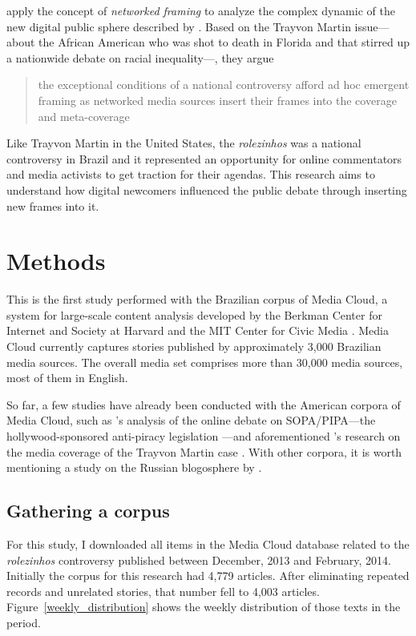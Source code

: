 \citeauthor{graeff2014battle} apply the concept of \emph{networked framing} to analyze the complex dynamic of the new digital public sphere described by \citeauthor{benkler2006wealth}. Based on the Trayvon Martin issue---about the African American who was shot to death in Florida and that stirred up a nationwide debate on racial inequality---, they argue \blockcquote{graeff2014battle}[.]{the exceptional conditions of a national controversy \textelp{} afford ad hoc emergent framing as networked media sources insert their frames into the coverage and meta-coverage}

Like Trayvon Martin in the United States, the \emph{rolezinhos} was a national controversy in Brazil and it represented an opportunity for online commentators and media activists to get traction for their agendas. This research aims to understand how digital newcomers influenced the public debate through inserting new frames into it.

\section{Methods}
\label{sec:methods}

This is the first study performed with the Brazilian corpus of Media Cloud, a system for large-scale content analysis developed by the Berkman Center for Internet and Society at Harvard and the MIT Center for Civic Media \autocite{about_media_cloud}. Media Cloud currently captures stories published by approximately 3,000 Brazilian media sources. The overall media set comprises more than 30,000 media sources, most of them in English.

So far, a few studies have already been conducted with the American corpora of Media Cloud, such as \citeauthor{benkler2013social}'s analysis of the online debate on SOPA/PIPA---the hollywood-sponsored anti-piracy legislation \autocite{benkler2013social}---and aforementioned \citeauthor{graeff2014battle}'s research on the media coverage of the Trayvon Martin case \autocite{graeff2014battle}. With other corpora, it is worth mentioning a study on the Russian blogosphere by \citeauthor{etling2014blogs} \autocite{etling2014blogs}.

\subsection{Gathering a corpus}

For this study, I downloaded all items in the Media Cloud database related to the \emph{rolezinhos} controversy published between December,  2013 and February,  2014. Initially the corpus for this research had 4,779 articles. After eliminating repeated records and unrelated stories, that number fell to 4,003 articles. Figure~\ref{weekly_distribution} shows the weekly distribution of those texts in the period.

